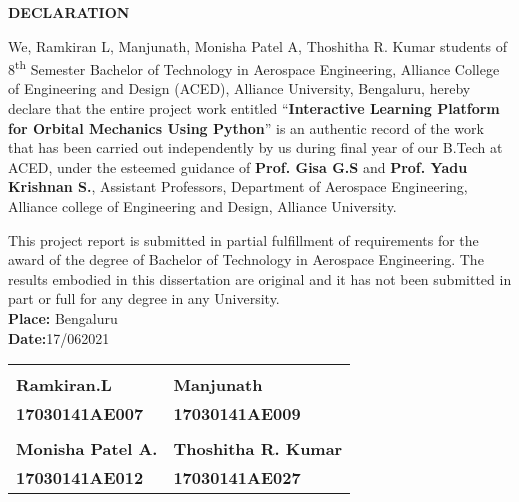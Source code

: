 \begin{center}
\Large \textbf{DECLARATION}
\end{center}
\normalsize
\hspace{4em}We, Ramkiran L, Manjunath, Monisha Patel A, Thoshitha R. Kumar students of 8\textsuperscript{th} Semester Bachelor of Technology in Aerospace Engineering, Alliance College of Engineering and Design (ACED), Alliance University, Bengaluru, hereby declare that the entire project work entitled \enquote{\textbf{Interactive Learning Platform for Orbital Mechanics Using Python}} is an authentic record of the work that has been carried out independently by us during final year of our B.Tech at ACED, under the esteemed guidance of \textbf{Prof. Gisa G.S} and \textbf{Prof. Yadu Krishnan S.}, Assistant Professors, Department of Aerospace Engineering, Alliance college of Engineering and Design, Alliance University. \par

This project report is submitted in partial fulfillment of requirements for the award of the degree of Bachelor of Technology in Aerospace Engineering. The results embodied in this dissertation are original and it has not been submitted in part or full for any degree in any University. \vspace{4em}\\
\textbf{Place:} Bengaluru\\
\textbf{Date:}17/062021 \vspace{5em}\\

\begin{center}
\begin{tabular}{K{7.5cm} K{7.5cm}}
\underline{\hspace{2.5cm}} & \underline{\hspace{2.5cm}} \\ 
\textbf{Ramkiran.L} & \textbf{Manjunath} \\ 
\textbf{17030141AE007} & \textbf{17030141AE009} \vspace{3em}\\ 
\underline{\hspace{3cm}} & \underline{\hspace{4cm}} \\ 
\textbf{Monisha Patel A.} & \textbf{Thoshitha R. Kumar} \\ 
\textbf{17030141AE012} & \textbf{17030141AE027}
\end{tabular} 
\end{center}
\thispagestyle{empty}